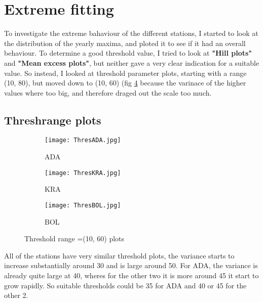\documentclass{article}
\begin{document}
 	\section{Extreme fitting}
 	To investigate the extreme bahaviour of the different stations, I started to look at the distribution of the yearly maxima, and ploted it to see if it had an overall behaviour. To determine a good threshold value, I tried to look at \textbf{"Hill plots"} and \textbf{"Mean excess plots"}, but neither gave a very clear indication for a suitable value. So instead, I looked at threshold parameter plots, starting with a range (10, 80), but moved down to (10, 60) (fig \ref{T1060} because the varinace of the higher values where too big, and therefore draged out the scale too much. 
 	\subsection{Threshrange plots}
 	\begin{figure}[H]
 		\centering
 		\begin{subfigure}{0.5\textwidth}
 			\centering
 			\texttt{[image: ThresADA.jpg]}
 			\caption{ADA}
 			\label{TADA}
 		\end{subfigure}%
 		\begin{subfigure}{0.5\textwidth}
 			\centering
 			\texttt{[image: ThresKRA.jpg]}
 			\caption{KRA}
 			\label{TKRA}
 		\end{subfigure}
 		\begin{subfigure}{0.5\textwidth}
 			\centering
 			\texttt{[image: ThresBOL.jpg]}
 			\caption{BOL}
 			\label{TBOL}
 		\end{subfigure}
 		\caption{Threshold range =(10, 60) plots}
 		\label{T1060}
 	\end{figure}
 
	All of the stations have very similar threshold plots, the variance starts to increase substantially around 30 and is large around 50. For ADA, the variance is already quite large at 40, wheres for the other two it is more around 45 it start to grow rapidly. So suitable thresholds could be 35 for ADA and 40 or 45 for the other 2.
\end{document}
